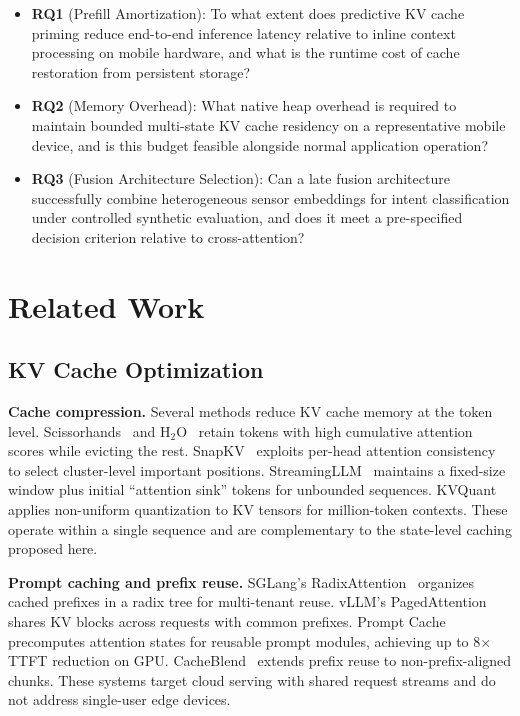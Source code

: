 \documentclass[journal]{IEEEtran}
\begin{document}
\begin{itemize}
    \item \textbf{RQ1} (Prefill Amortization): To what extent does predictive KV cache priming reduce end-to-end inference latency relative to inline context processing on mobile hardware, and what is the runtime cost of cache restoration from persistent storage?
    \item \textbf{RQ2} (Memory Overhead): What native heap overhead is required to maintain bounded multi-state KV cache residency on a representative mobile device, and is this budget feasible alongside normal application operation?
    \item \textbf{RQ3} (Fusion Architecture Selection): Can a late fusion architecture successfully combine heterogeneous sensor embeddings for intent classification under controlled synthetic evaluation, and does it meet a pre-specified decision criterion relative to cross-attention?
\end{itemize}

\section{Related Work}
\label{sec:related}

\subsection{KV Cache Optimization}
\label{sec:related_kvcache}

\textbf{Cache compression.} Several methods reduce KV cache memory at the token level. Scissorhands~\cite{scissorhands} and H$_2$O~\cite{h2o} retain tokens with high cumulative attention scores while evicting the rest. SnapKV~\cite{snapkv} exploits per-head attention consistency to select cluster-level important positions. StreamingLLM~\cite{streamingllm} maintains a fixed-size window plus initial ``attention sink'' tokens for unbounded sequences. KVQuant~\cite{kvquant} applies non-uniform quantization to KV tensors for million-token contexts. These operate within a single sequence and are complementary to the state-level caching proposed here.

\textbf{Prompt caching and prefix reuse.} SGLang's RadixAttention~\cite{sglang} organizes cached prefixes in a radix tree for multi-tenant reuse. vLLM's PagedAttention~\cite{vllm} shares KV blocks across requests with common prefixes. Prompt Cache~\cite{promptcache} precomputes attention states for reusable prompt modules, achieving up to 8$\times$ TTFT reduction on GPU. CacheBlend~\cite{cacheblend} extends prefix reuse to non-prefix-aligned chunks. These systems target cloud serving with shared request streams and do not address single-user edge devices.
\end{document}
